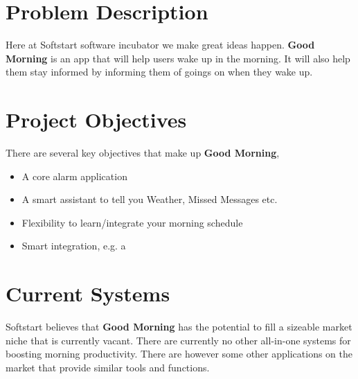 \documentclass[11pt]{article}
\begin{document}

%
\section{Problem Description}\label{problem-description}

Here at Softstart software incubator we make great ideas happen.
\textbf{Good Morning} is an app that will help users wake up in the
morning. It will also help them stay informed by informing them of
goings on when they wake up.


%
\section{Project Objectives}\label{project-objectives}

There are several key objectives that make up \textbf{Good Morning},

\begin{itemize}
\item
  A core alarm application
\item
  A smart assistant to tell you Weather, Missed Messages etc.
\item
  Flexibility to learn/integrate your morning schedule
\item
  Smart integration, e.g. a 
\end{itemize}


%
\section{Current Systems}\label{current-systems}

Softstart believes that \textbf{Good Morning} has the potential to fill
a sizeable market niche that is currently vacant. There are currently no other all-in-one systems
for boosting morning productivity. There are however some other applications
on the market that provide similar tools and functions.
\end{document}
